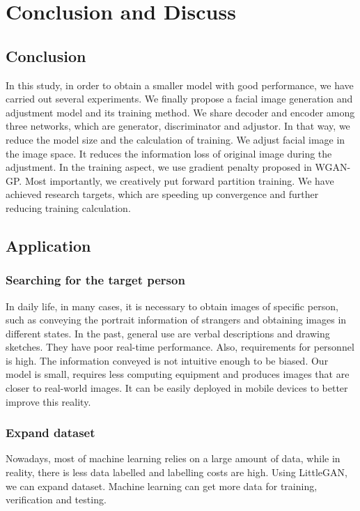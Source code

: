 \section{Conclusion and Discuss}
\subsection{Conclusion}
In this study, in order to obtain a smaller model with good performance, we have carried out several experiments.
We finally propose a facial image generation and adjustment model and its training method.
We share decoder and encoder among three networks, which are generator, discriminator and adjustor.
In that way, we reduce the model size and the calculation of training.
We adjust facial image in the image space.
It reduces the information loss of original image during the adjustment.
In the training aspect, we use gradient penalty proposed in WGAN-GP.
Most importantly, we creatively put forward partition training.
We have achieved research targets, which are speeding up convergence and further reducing training calculation.

\subsection{Application}
\subsubsection*{Searching for the target person}
In daily life, in many cases, it is necessary to obtain images of specific person, such as conveying the portrait information of strangers and obtaining images in different states.
In the past, general use are verbal descriptions and drawing sketches.
They have poor real-time performance.
Also, requirements for personnel is high.
The information conveyed is not intuitive enough to be biased.
Our model is small, requires less computing equipment and produces images that are closer to real-world images.
It can be easily deployed in mobile devices to better improve this reality.

\subsubsection*{Expand dataset}
Nowadays, most of machine learning relies on a large amount of data,
    while in reality, there is less data labelled and labelling costs are high.
Using LittleGAN, we can expand dataset.
Machine learning can get more data for training,
    verification and testing.

